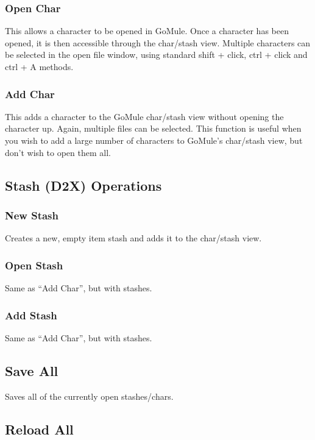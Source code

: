 \documentclass[a4paper,10pt]{article}
\begin{document}
\subsubsection{Open Char}

This allows a character to be opened in GoMule. Once a character has been opened, it is then accessible through the char/stash view. Multiple characters can be selected in the open file window, using standard shift + click, ctrl + click and ctrl + A methods.

\subsubsection{Add Char}

This adds a character to the GoMule char/stash view without opening the character up. Again, multiple files can be selected. This function is useful when you wish to add a large number of characters to GoMule's char/stash view, but don't wish to open them all. 

\subsection{Stash (D2X) Operations}

\subsubsection{New Stash}

Creates a new, empty item stash and adds it to the char/stash view.

\subsubsection{Open Stash}

Same as ``Add Char'', but with stashes. 

\subsubsection{Add Stash}

Same as ``Add Char'', but with stashes.

\subsection{Save All}

Saves all of the currently open stashes/chars.

\subsection{Reload All}
\end{document}
